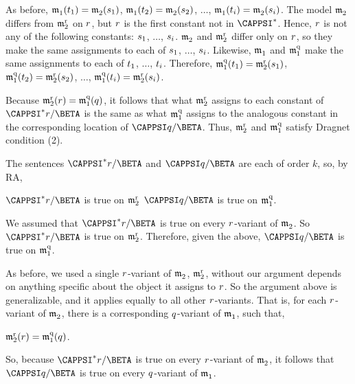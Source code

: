 \begin{PROOF}
\begin{description}
\begin{description}
\begin{SUBPROOF}
As before, $\mathfrak{m^{\mathrm{}}_{\mathrm{1}}}(t_1)=\mathfrak{m^{\mathrm{}}_{\mathrm{2}}}(s_1)$, $\mathfrak{m^{\mathrm{}}_{\mathrm{1}}}(t_2)=\mathfrak{m^{\mathrm{}}_{\mathrm{2}}}(s_2)$, $\ldots$, $\mathfrak{m^{\mathrm{}}_{\mathrm{1}}}(t_{i})=\mathfrak{m^{\mathrm{}}_{\mathrm{2}}}(s_{i})$.  The model $\mathfrak{m^{\mathrm{}}_{\mathrm{2}}}$ differs from $\mathfrak{m^{\mathrm{r}}_{\mathrm{2}}}$ on $r$, but $r$ is the first constant not in $\CAPPSI^*$.  Hence, $r$ is not any of the following constants: $s_1$, $\ldots$, $s_i$.  $\mathfrak{m^{\mathrm{}}_{\mathrm{2}}}$ and $\mathfrak{m^{\mathrm{r}}_{\mathrm{2}}}$ differ only on $r$, so they make the same assignments to each of $s_1$, $\ldots$, $s_i$.  Likewise, $\mathfrak{m^{\mathrm{}}_{\mathrm{1}}}$ and $\mathfrak{m^{\mathrm{q}}_{\mathrm{1}}}$ make the same assignments to each of $t_1$, $\ldots$, $t_i$.  Therefore, $\mathfrak{m^{\mathrm{q}}_{\mathrm{1}}}(t_1)=\mathfrak{m^{\mathrm{r}}_{\mathrm{2}}}(s_1)$, $\mathfrak{m^{\mathrm{q}}_{\mathrm{1}}}(t_2)=\mathfrak{m^{\mathrm{r}}_{\mathrm{2}}}(s_2)$, $\ldots$, $\mathfrak{m^{\mathrm{q}}_{\mathrm{1}}}(t_{i})=\mathfrak{m^{\mathrm{r}}_{\mathrm{2}}}(s_{i})$.

Because $\mathfrak{m^{\mathrm{r}}_{\mathrm{2}}}(r)=\mathfrak{m^{\mathrm{q}}_{\mathrm{1}}}(q)$, it follows that what $\mathfrak{m^{\mathrm{r}}_{\mathrm{2}}}$ assigns to each constant of $\CAPPSI^*\variable{r}/\BETA$ is the same as what $\mathfrak{m^{\mathrm{q}}_{\mathrm{1}}}$ assigns to the analogous constant in the corresponding location of $\CAPPSI\variable{q}/\BETA$.  Thus, $\mathfrak{m^{\mathrm{r}}_{\mathrm{2}}}$ and $\mathfrak{m^{\mathrm{q}}_{\mathrm{1}}}$ satisfy Dragnet condition (2).

The sentences $\CAPPSI^*\variable{r}/\BETA$ and $\CAPPSI\variable{q}/\BETA$ are each of order $k$, so, by RA,

\begin{center}
	$\CAPPSI^*\variable{r}/\BETA$ is true on $\mathfrak{m^{\mathrm{r}}_{\mathrm{2}}}$ \Iff $\CAPPSI\variable{q}/\BETA$ is true on $\mathfrak{m^{\mathrm{q}}_{\mathrm{1}}}$.
\end{center}

We assumed that $\CAPPSI^*\variable{r}/\BETA$ is true on every $r$-variant of $\mathfrak{m^{\mathrm{}}_{\mathrm{2}}}$.  So $\CAPPSI^*\variable{r}/\BETA$ is true on $\mathfrak{m^{\mathrm{r}}_{\mathrm{2}}}$.  Therefore, given the above, $\CAPPSI\variable{q}/\BETA$ is true on $\mathfrak{m^{\mathrm{q}}_{\mathrm{1}}}$.

As before, we used a single $r$-variant of $\mathfrak{m^{\mathrm{}}_{\mathrm{2}}}$, $\mathfrak{m^{\mathrm{r}}_{\mathrm{2}}}$, without our argument depends on anything specific about the object it assigns to $r$.  So the argument above is generalizable, and it applies equally to all other $r$-variants.  That is, for each $r$-variant of $\mathfrak{m^{\mathrm{}}_{\mathrm{2}}}$, there is a corresponding $q$-variant of $\mathfrak{m^{\mathrm{}}_{\mathrm{1}}}$, such that, 
\begin{center}
	$\mathfrak{m^{\mathrm{r}}_{\mathrm{2}}}(r)=\mathfrak{m^{\mathrm{q}}_{\mathrm{1}}}(q)$.
\end{center}
So, because $\CAPPSI^*\variable{r}/\BETA$ is true on every $r$-variant of $\mathfrak{m^{\mathrm{}}_{\mathrm{2}}}$, it follows that $\CAPPSI\variable{q}/\BETA$ is true on every $q$-variant of $\mathfrak{m^{\mathrm{}}_{\mathrm{1}}}$.\\


\end{SUBPROOF}
\end{description}
\end{description}
\end{PROOF}
